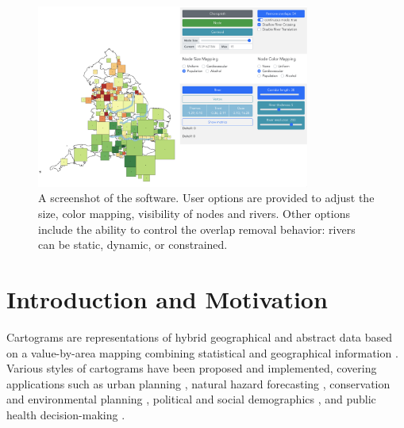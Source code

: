 {
    \begin{figure}[ht!]
        \centering
        \includegraphics[width=0.8\textwidth,keepaspectratio]{figure/UI.png}
        \caption{A screenshot of the software. User options are provided to adjust the size, color mapping, visibility of nodes and rivers. Other options include the ability to control the overlap removal behavior: rivers can be static, dynamic, or constrained.}
        \label{fig:overview}
    \end{figure}
}

\section{Introduction and Motivation}

Cartograms are representations of hybrid geographical and abstract data based on a value-by-area mapping combining statistical and geographical information \cite{dent2009Cartography}. Various styles of cartograms have been proposed and implemented, covering applications such as urban planning \cite{harris2018Mapping, arranz-lopez2021Enduser}, natural hazard forecasting \cite{pappenberger2019Cartograms, park2020Flood}, conservation and environmental planning \cite{galluzzi2018Mapping, rocchini2019Cartogramming}, political and social demographics \cite{breitzman2018Using, alieva2021How}, and public health decision-making \cite{gao2020Visualising, sack2021Visualizing}.

